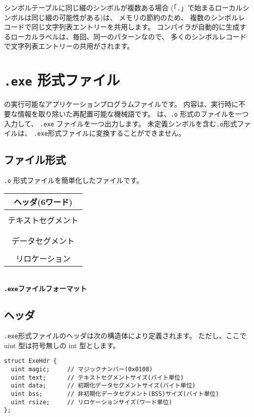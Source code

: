 シンボルテーブルに同じ綴のシンボルが複数ある場合
(「\verb/./」で始まるローカルシンボルは同じ綴の可能性がある)は、
メモリの節約のため、
複数のシンボルレコードで同じ文字列表エントリーを共用します。
\cmm コンパイラが自動的に生成するローカルラベルは、毎回、同一のパターンなので、
多くのシンボルレコードで文字列表エントリーの共用がされます。

\section{{\tt .exe} 形式ファイル}
\label{app:eformat}

\tacos の実行可能なアプリケーションプログラムファイルです。
内容は、実行時に不要な情報を取り除いた再配置可能な機械語です。
{\objexe}は、{\tt .o} 形式のファイルを一つ入力して、
{\tt .exe} ファイルを一つ出力します。
未定義シンボルを含む{\tt .o}形式ファイルは、
{\tt .exe}形式ファイルに変換することができません。

\subsection{ファイル形式}

{\tt .o} 形式ファイルを簡単化したファイルです。

\begin{myminipage}
\begin{tabular}{|c|}
\hline
ヘッダ(6ワード) \\
\hline
\\
テキストセグメント \\
\\
\hline
\\
データセグメント \\
\\
\hline
リロケーション \\
\hline
\end{tabular}
\\\vspace{0.2cm}
{\bf {\tt .exe}ファイルフォーマット}
\end{myminipage}

\subsection{ヘッダ}

{\tt .exe}形式ファイルのヘッダは次の構造体により定義されます。
ただし、ここで uint 型は符号無しの int 型とします。

\begin{mylist}
\begin{verbatim}
struct ExeHdr {
  uint magic;     // マジックナンバー(0x0108)
  uint text;      // テキストセグメントサイズ(バイト単位)
  uint data;      // 初期化データセグメントサイズ(バイト単位)
  uint bss;       // 非初期化データセグメント(BSS)サイズ(バイト単位)
  uint rsize;     // リロケーションサイズ(ワード単位)
};
\end{verbatim}
\end{mylist}

